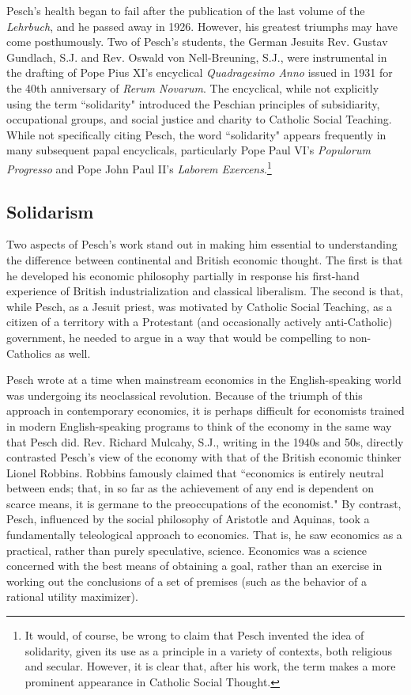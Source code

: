 \documentclass{article}
\begin{document}
Pesch’s health began to fail after the publication of the last volume of the \emph{Lehrbuch}, and he passed away in 1926.  However, his greatest triumphs may have come posthumously.  Two of Pesch’s students, the German Jesuits Rev. Gustav Gundlach, S.J. and Rev. Oswald von Nell-Breuning, S.J., were instrumental in the drafting of Pope Pius XI’s encyclical \emph{Quadragesimo Anno} issued in 1931 for the 40th anniversary of \emph{Rerum Novarum}.  The encyclical, while not explicitly using the term ``solidarity" introduced the Peschian principles of subsidiarity, occupational groups, and social justice and charity to Catholic Social Teaching. \citep{ederer1991}  While not specifically citing Pesch, the word ``solidarity" appears frequently in many subsequent papal encyclicals, particularly Pope Paul VI’s \emph{Populorum Progresso} and Pope John Paul II’s \emph{Laborem Exercens}.\footnote{It would, of course, be wrong to claim that Pesch invented the idea of solidarity, given its use as a principle in a variety of contexts, both religious and secular.  However, it is clear that, after his work, the term makes a more prominent appearance in Catholic Social Thought.}

\subsection{Solidarism}

Two aspects of Pesch’s work stand out in making him essential to understanding the difference between continental and British economic thought.  The first is that he developed his economic philosophy partially in response his first-hand experience of British industrialization and classical liberalism.  The second is that, while Pesch, as a Jesuit priest, was motivated by Catholic Social Teaching, as a citizen of a territory with a Protestant (and occasionally actively anti-Catholic) government, he needed to argue in a way that would be compelling to non-Catholics as well.\medskip

Pesch wrote at a time when mainstream economics in the English-speaking world was undergoing its neoclassical revolution.  Because of the triumph of this approach in contemporary economics, it is perhaps difficult for economists trained in modern English-speaking programs to think of the economy in the same way that Pesch did.  Rev. Richard Mulcahy, S.J., writing in the 1940s and 50s, directly contrasted Pesch’s view of the economy with that of the British economic thinker Lionel Robbins. \citep{mulcahy1949}  Robbins famously claimed that ``economics is entirely neutral between ends; that, in so far as the achievement of any end is dependent on scarce means, it is germane to the preoccupations of the economist." \citep[p.23]{robbins1932}  By contrast, Pesch, influenced by the social philosophy of Aristotle and Aquinas, took a fundamentally teleological approach to economics.  That is, he saw economics as a practical, rather than purely speculative, science.  Economics was a science concerned with the best means of obtaining a goal, rather than an exercise in working out the conclusions of a set of premises (such as the behavior of a rational utility maximizer).\medskip
\end{document}
